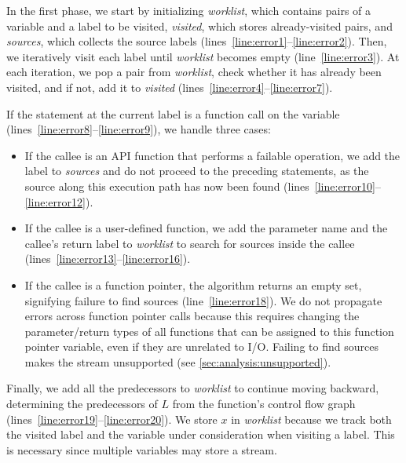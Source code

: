 In the first phase, we start by initializing \textit{worklist}, which contains
pairs of a variable and a label to be visited, \textit{visited}, which stores
already-visited pairs, and \textit{sources}, which collects the source labels
(lines~\ref{line:error1}--\ref{line:error2}).
%
Then, we iteratively visit each label until \textit{worklist} becomes empty
(line~\ref{line:error3}).
%
At each iteration, we pop a pair from \textit{worklist}, check whether it has
already been visited, and if not, add it to \textit{visited}
(lines~\ref{line:error4}--\ref{line:error7}).

If the statement at the current label is a function call on the variable
(lines~\ref{line:error8}--\ref{line:error9}), we handle three cases:
%
\begin{itemize}
  \item
    If the callee is an API function that performs a failable operation, we add
    the label to \textit{sources} and do not proceed to the preceding
    statements, as the source along this execution path has now been found
    (lines~\ref{line:error10}--\ref{line:error12}).
  \item
    If the callee is a user-defined function, we add the parameter name and the
    callee's return label to \textit{worklist} to search for sources inside the
    callee (lines~\ref{line:error13}--\ref{line:error16}).
  \item
    If the callee is a function pointer, the algorithm returns an empty set,
    signifying failure to find sources (line~\ref{line:error18}).
    We do not propagate errors across function pointer calls because this
    requires changing the parameter/return types of all functions that can be
    assigned to this function pointer variable, even if they are unrelated to
    I/O.
    Failing to find sources makes the stream unsupported (see
    \cref{sec:analysis:unsupported}).
\end{itemize}
%
Finally, we add all the predecessors to \textit{worklist} to continue moving
backward, determining the predecessors of $L$ from the function's control flow
graph (lines~\ref{line:error19}--\ref{line:error20}).
%
We store $x$ in \textit{worklist} because we track both the visited label and
the variable under consideration when visiting a label.
%
This is necessary since multiple variables may store a stream.

